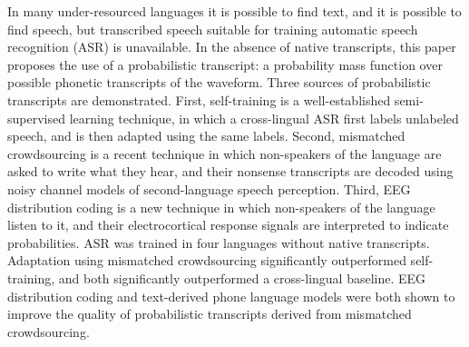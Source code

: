 In many under-resourced languages it is possible to find text, and it is possible to find speech, but transcribed speech suitable for training automatic speech recognition (ASR) is unavailable.  In the absence of native transcripts, this paper proposes the use of a probabilistic transcript: a probability mass function over possible phonetic transcripts of the waveform.  Three sources of probabilistic transcripts are demonstrated.  First, self-training is a well-established semi-supervised learning technique, in which a cross-lingual ASR first labels unlabeled speech, and is then adapted using the same labels.  Second, mismatched crowdsourcing is a recent technique in which non-speakers of the language are asked to write what they hear, and their nonsense transcripts are decoded using noisy channel models of second-language speech perception.  Third, EEG distribution coding is a new technique in which non-speakers of the language listen to it, and their electrocortical response signals are interpreted to indicate probabilities.  ASR was trained in four languages without native transcripts.  Adaptation using mismatched crowdsourcing significantly outperformed self-training, and both significantly outperformed a cross-lingual baseline.  EEG distribution coding and text-derived phone language models were both shown to improve the quality of probabilistic transcripts derived from mismatched crowdsourcing.
